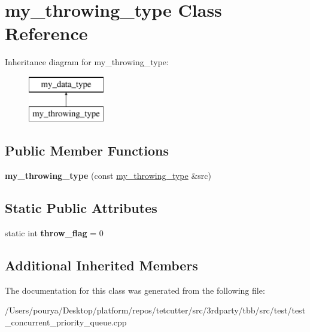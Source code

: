 \hypertarget{classmy__throwing__type}{}\section{my\+\_\+throwing\+\_\+type Class Reference}
\label{classmy__throwing__type}
Inheritance diagram for my\+\_\+throwing\+\_\+type\+:\begin{figure}[H]
\begin{center}
\leavevmode
\includegraphics[height=2.000000cm]{classmy__throwing__type}
\end{center}
\end{figure}
\subsection*{Public Member Functions}
\begin{DoxyCompactItemize}
\item 
\hypertarget{classmy__throwing__type_a4e70be47f1ba0aca4d321180a8d6772b}{}{\bfseries my\+\_\+throwing\+\_\+type} (const \hyperlink{classmy__throwing__type}{my\+\_\+throwing\+\_\+type} \&src)\label{classmy__throwing__type_a4e70be47f1ba0aca4d321180a8d6772b}

\end{DoxyCompactItemize}
\subsection*{Static Public Attributes}
\begin{DoxyCompactItemize}
\item 
\hypertarget{classmy__throwing__type_ad7e97049a66868028429173f801d1f3e}{}static int {\bfseries throw\+\_\+flag} = 0\label{classmy__throwing__type_ad7e97049a66868028429173f801d1f3e}

\end{DoxyCompactItemize}
\subsection*{Additional Inherited Members}


The documentation for this class was generated from the following file\+:\begin{DoxyCompactItemize}
\item 
/\+Users/pourya/\+Desktop/platform/repos/tetcutter/src/3rdparty/tbb/src/test/test\+\_\+concurrent\+\_\+priority\+\_\+queue.\+cpp\end{DoxyCompactItemize}
